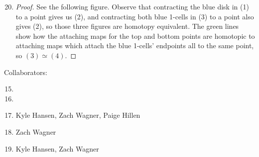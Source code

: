 \documentclass[12pt,letterpaper]{article}
\begin{document}
\begin{enumerate}
\setcounter{enumi}{19}
\item[\phantom{19.}]
\vspace*{-5ex}
\begin{proof}
See the following figure. 
\vspace*{-2ex}Observe that contracting the blue disk in (1) to a point gives us (2), and contracting both blue 1-cells in (3) to a point also gives (2), so those three figures are homotopy equivalent. The green lines show how the attaching maps for the top and bottom points are homotopic to attaching maps which attach the blue 1-cells' endpoints all to the same point, so ${(3) \simeq (4)}$. 
\end{proof}
\end{enumerate}

\vfill

Collaborators:
\begin{enumerate}
\setcounter{enumi}{14}
\item 

\item 

\setcounter{enumi}{17}
\item Kyle Hansen, Zach Wagner, Paige Hillen

\item Zach Wagner

\item Kyle Hansen, Zach Wagner
\end{enumerate}
\end{document}
